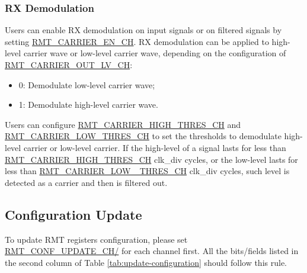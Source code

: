 \documentclass[main\_\_EN.tex]{subfiles}
\begin{document}
\subsubsection{RX Demodulation}

Users can enable RX demodulation on input signals or on filtered signals by setting \hyperref[fielddesc:RMTCARRIERENCHM]{RMT\_CARRIER\_EN\_CH}. RX demodulation can be applied to high-level carrier wave or low-level carrier wave, depending on the configuration of \hyperref[fielddesc:RMTCARRIEROUTLVCHM]{RMT\_CARRIER\_OUT\_LV\_CH}:
\begin{itemize}
    \item 0: Demodulate low-level carrier wave;
    \item 1: Demodulate high-level carrier wave.
\end{itemize}

Users can configure \hyperref[fielddesc:RMTCARRIERHIGHTHRESCHM]{RMT\_CARRIER\_HIGH\_THRES\_CH} and \hyperref[fielddesc:RMTCARRIERLOWTHRESCHM]{RMT\_CARRIER\_LOW\_THRES\_CH} to set the thresholds to demodulate high-level carrier or low-level carrier. If the high-level of a signal lasts for less than \hyperref[fielddesc:RMTCARRIERHIGHTHRESCHM]{RMT\_CARRIER\_HIGH\_THRES\_CH} clk\_div cycles, or the low-level lasts for less than \hyperref[fielddesc:RMTCARRIERLOWTHRESCHM]{RMT\_CARRIER\_LOW \_THRES\_CH} clk\_div cycles, such level is detected as a carrier and then is filtered out.

\subsection{Configuration Update}\label{conf_update}
To update RMT registers configuration, please set \hyperref[fielddesc:RMTCONFUPDATECHN]{RMT\_CONF\_UPDATE\_CH/} for each channel first. All the bits/fields listed in the second column of Table  \ref{tab:update-configuration} should follow this rule.
\end{document}
